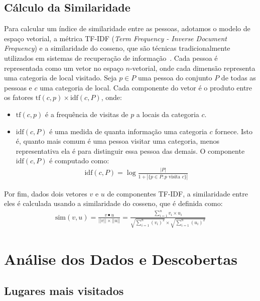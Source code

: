 \documentclass[12pt]{article}
\begin{document}
\subsection{Cálculo da Similaridade}\label{similaridade}

Para calcular um índice de similaridade entre as pessoas, adotamos o modelo de espaço vetorial, a métrica TF-IDF ({\em Term Frequency - Inverse Document Frequency}) e a similaridade do cosseno, que são técnicas tradicionalmente utilizados em sistemas de recuperação de informação~\cite{manning2008}. Cada pessoa é representada como um vetor no espaço $n$-vetorial, onde cada dimensão representa uma categoria de local visitado. Seja $p \in P$ uma pessoa do conjunto $P$ de todas as pessoas e $c$ uma categoria de local. Cada componente do vetor é o produto entre os fatores $\text{tf}(c, p) \times \text{idf}(c, P)$, onde:
\begin{itemize}
\item $\text{tf}(c, p)$ é a frequência de visitas de $p$ a locais da categoria $c$.
\item $\text{idf}(c, P)$ é uma medida de quanta informação uma categoria $c$ fornece. Isto é, quanto mais comum é uma pessoa visitar uma categoria, menos representativa ela é para distinguir essa pessoa das demais. O componente $\text{idf}(c, P)$ é computado como:
\begin{align*}
\text{idf}(c, P) = \log \frac{|P|}{1 + |\{p \in P : \text{$p$ visita $c$}  \}|}
\end{align*}
\end{itemize}

Por fim, dados dois vetores $v$ e $u$ de componentes TF-IDF, a similaridade entre eles é calculada usando a similaridade do cosseno, que é definida como:
\begin{align*}
\text{sim}(v, u) = \frac{v \bullet u}{||v|| \times ||u||} = \frac{\sum_{i=1}^{n} v_i \times u_i}{\sqrt{\sum_{i=1}^{n} (v_i)^2} \times \sqrt{\sum_{i=1}^{n} (u_i)^2}}
\end{align*}




\section{Análise dos Dados e Descobertas}

\subsection{Lugares mais visitados}
\end{document}
